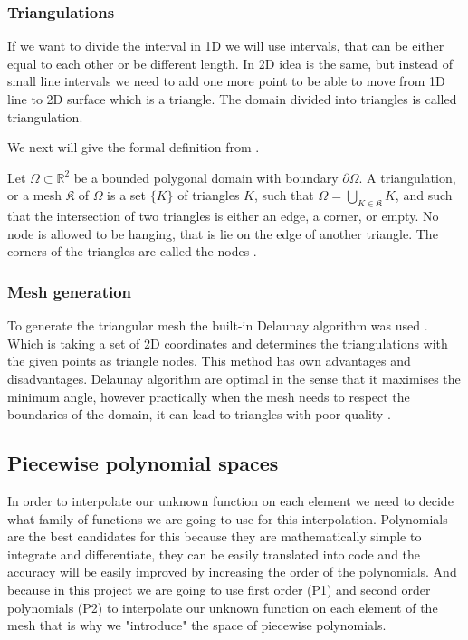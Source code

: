 \documentclass[acmsmall,screen]{MapleTrans}
\begin{document}
\subsubsection{Triangulations} 
If we want to divide the interval in 1D we will use intervals, that can be either equal to each other or be different length. 
In 2D idea is the same, but instead of small line intervals we need to add one more point to be able to move from 1D line to 2D surface which is a triangle. The domain divided into triangles is called triangulation.

We next will give the formal definition from \cite{b10}.

Let $\Omega \subset \mathbb{R}^2$ be a bounded polygonal domain with boundary $\partial\Omega$. A triangulation, or a mesh $\mathfrak{K}$ of $\Omega$ is a set $\{K\}$ of triangles $K$, such that $\Omega = \bigcup_{K \in \mathfrak{K}}K$, and such that the intersection of two triangles is either an edge, a corner, or empty. 
No node is allowed to be hanging, that is lie on the edge of another triangle. The corners of the triangles are called the nodes \cite{b10}.


\subsubsection{Mesh generation}
To generate the triangular mesh the built-in Delaunay algorithm was used \cite{b12}. Which is taking a set of 2D coordinates and determines the triangulations with the given points as triangle nodes. 
This method has own advantages and disadvantages. Delaunay algorithm are optimal in the sense that it maximises the minimum angle, however practically when the mesh needs to respect the boundaries of the domain, it can lead to triangles with poor quality \cite{b10}.


\subsection{Piecewise polynomial spaces}
In order to interpolate our unknown function on each element we need to decide what family of functions we are going to use for this interpolation. 
Polynomials are the best candidates for this because they are mathematically simple to integrate and differentiate, they can be easily translated into code and the accuracy will be easily improved by increasing the order of the polynomials. And because in this project we are going to use first order (P1) and second order polynomials (P2) to interpolate our unknown function on each element of the mesh that is why we "introduce" the space of piecewise polynomials. 
\end{document}
